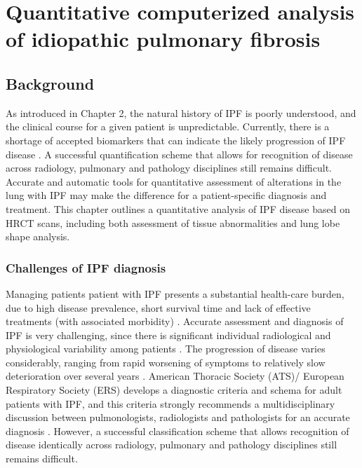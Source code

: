 \chapter{Quantitative computerized analysis of idiopathic pulmonary fibrosis} \label{Yuwen_QuantitiativeAnalysis}

\section{Background}
As introduced in Chapter 2, the natural history of IPF is poorly understood, and the clinical course for a given patient is unpredictable. Currently, there is a shortage of accepted biomarkers that can indicate the likely progression of IPF disease \citep{bartholmai2013quantitative}. A successful quantification scheme that allows for recognition of disease across radiology, pulmonary and pathology disciplines still remains difficult. Accurate and automatic tools for quantitative assessment of alterations in the lung with IPF may make the difference for a patient-specific diagnosis and treatment. This chapter outlines a quantitative analysis of IPF disease based on HRCT scans, including both assessment of tissue abnormalities and lung lobe shape analysis. 

\subsection{Challenges of IPF diagnosis} \label{Challenge}
Managing patients patient with IPF presents a substantial health-care burden, due to high disease prevalence, short survival time and lack of effective treatments (with associated morbidity) \citep{olson2007mortality,raghunath2014quantitative}. Accurate assessment and diagnosis of IPF is very challenging, since there is significant individual radiological and physiological variability among patients \citep{devaraj2014imaging}. The progression of disease varies considerably, ranging from rapid worsening of symptoms to relatively slow deterioration over several years \citep{king2011idiopathic,richeldi2017idiopathic}. American Thoracic Society (ATS)/ European Respiratory Society (ERS) develops a diagnostic criteria and schema for adult patients with IPF, and this criteria strongly recommends a multidisciplinary discussion between pulmonologists, radiologists and pathologists for an accurate diagnosis \citep{raghu2011official,travis2013official}. However, a successful classification scheme that allows recognition of disease identically across radiology, pulmonary and pathology disciplines still remains difficult. 

